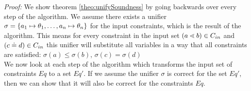 \textit{Proof:}
We show theorem \ref{theo:unifySoundness} by going backwards over every step of the algorithm.
We assume there exists a unifier $\sigma = \{ a_1 \mapsto \theta_1, \ldots , a_n \mapsto \theta_n \}$ for the input constraints,
which is the result of the \unify{} algorithm.
This means for every constraint in the input set $(a \lessdot b) \in C_{in}$ and $(c \doteq d) \in C_{in}$
this unifier will substitute all variables in a way that all constraints are satisfied:
$\sigma(a) \leq \sigma(b)$, $\sigma(c) = \sigma(d)$\\

We now look at each step of the \unify{} algorithm
which transforms the input set of constraints $Eq$ to a set $Eq'$.
If we assume the unifier $\sigma$ is correct for the set $Eq'$,
then we can show that it will also be correct for the constraints $Eq$. 

